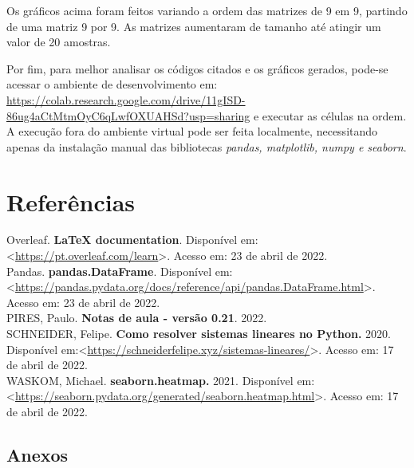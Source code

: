 \documentclass[a4paper,11pt]{article}
\begin{document}
    Os gráficos acima foram feitos variando a ordem das matrizes de 9 em 9, partindo de uma matriz 9 por 9. As matrizes aumentaram de tamanho até atingir um valor de 20 amostras.
    
    Por fim, para melhor analisar os códigos citados e os gráficos gerados, pode-se acessar o ambiente de desenvolvimento em: \url{https://colab.research.google.com/drive/11gISD-86ug4aCtMtmOyC6qLwfOXUAHSd?usp=sharing} e executar as células na ordem. A execução fora do ambiente virtual pode ser feita localmente, necessitando apenas da instalação manual das bibliotecas \textit{pandas, matplotlib, numpy e seaborn}.

\pagebreak

\section*{Referências}

Overleaf. \textbf{LaTeX documentation}. Disponível em:<\url{https://pt.overleaf.com/learn}>. Acesso em: 23 de abril de 2022.\\

Pandas. \textbf{pandas.DataFrame}. Disponível em:<\url{https://pandas.pydata.org/docs/reference/api/pandas.DataFrame.html}>. Acesso em: 23 de abril de 2022.\\

PIRES, Paulo. \textbf{Notas de aula - versão 0.21}. 2022.\\

SCHNEIDER, Felipe. \textbf{Como resolver sistemas lineares no Python.} 2020. Disponível em:<\url{https://schneiderfelipe.xyz/sistemas-lineares/}>. Acesso em: 17 de abril de 2022.\\

WASKOM, Michael. \textbf{seaborn.heatmap.} 2021. Disponível em:<\url{https://seaborn.pydata.org/generated/seaborn.heatmap.html}>. Acesso em: 17 de abril de 2022.\\

\pagebreak

\begin{center}
\section*{Anexos}
\end{center}

\pagebreak
\end{document}
